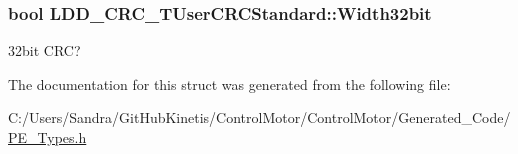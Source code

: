 \subsubsection[{\texorpdfstring{Width32bit}{Width32bit}}]{\setlength{\rightskip}{0pt plus 5cm}bool L\+D\+D\+\_\+\+C\+R\+C\+\_\+\+T\+User\+C\+R\+C\+Standard\+::\+Width32bit}\hypertarget{struct_l_d_d___c_r_c___t_user_c_r_c_standard_a82a24fa9104800759f278afc36a4e00e}{}\label{struct_l_d_d___c_r_c___t_user_c_r_c_standard_a82a24fa9104800759f278afc36a4e00e}
32bit C\+RC? 

The documentation for this struct was generated from the following file\+:\begin{DoxyCompactItemize}
\item 
C\+:/\+Users/\+Sandra/\+Git\+Hub\+Kinetis/\+Control\+Motor/\+Control\+Motor/\+Generated\+\_\+\+Code/\hyperlink{_p_e___types_8h}{P\+E\+\_\+\+Types.\+h}\end{DoxyCompactItemize}
